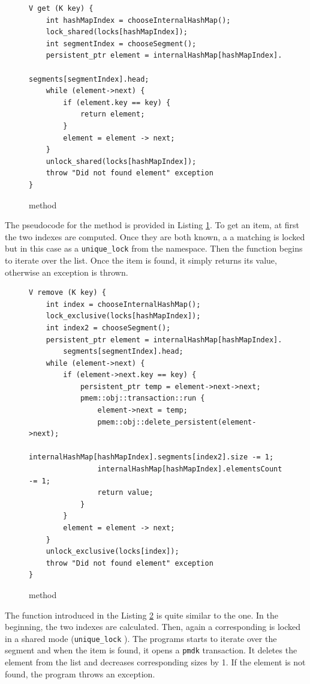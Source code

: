 \begin{figure}[ht]
\renewcommand{\figurename}{Listing}
\begin{lstlisting}
V get (K key) {
    int hashMapIndex = chooseInternalHashMap();
    lock_shared(locks[hashMapIndex]);
    int segmentIndex = chooseSegment();
    persistent_ptr element = internalHashMap[hashMapIndex].
                                    segments[segmentIndex].head;
    while (element->next) {
        if (element.key == key) {
            return element;
        }
        element = element -> next;
    }
    unlock_shared(locks[hashMapIndex]);
    throw "Did not found element" exception
}
\end{lstlisting}
\caption{\getMethod method}
\label{getMethod}
\end{figure}

        The pseudocode for the \getMethod method is provided in Listing \ref{getMethod}. 
        To get an item, at first the two indexes are computed. 
        Once they are both known, a a matching \internalHashMap is locked but in this case as a \texttt{unique\_lock} \cite{UniqueLock} from the \std namespace.
        Then the function begins to iterate over the list. 
        Once the item is found, it simply returns its value, otherwise an exception is thrown.
        
\begin{figure}[ht]
\renewcommand{\figurename}{Listing}
\begin{lstlisting}
V remove (K key) {
    int index = chooseInternalHashMap();
    lock_exclusive(locks[hashMapIndex]);
    int index2 = chooseSegment();
    persistent_ptr element = internalHashMap[hashMapIndex].
        segments[segmentIndex].head;
    while (element->next) {
        if (element->next.key == key) {
            persistent_ptr temp = element->next->next;
            pmem::obj::transaction::run {
                element->next = temp;
                pmem::obj::delete_persistent(element->next);
                internalHashMap[hashMapIndex].segments[index2].size -= 1;
                internalHashMap[hashMapIndex].elementsCount -= 1;
                return value;
            }
        }
        element = element -> next;
    } 
    unlock_exclusive(locks[index]);
    throw "Did not found element" exception
}
\end{lstlisting}
\caption{\removeMethod method}
\label{removeMethod}
\end{figure}

        The \removeMethod function introduced in the Listing \ref{removeMethod} is quite similar to the \getMethod one. 
        In the beginning, the two indexes are calculated. 
        Then, again a corresponding \internalHashMap is locked in a shared mode (\texttt{unique\_lock} \cite{UniqueLock}).
        The programs starts to iterate over the segment and when the item is found, it opens a \texttt{pmdk} transaction. 
        It deletes the element from the list and decreases corresponding sizes by 1.
        If the element is not found, the program throws an exception.

